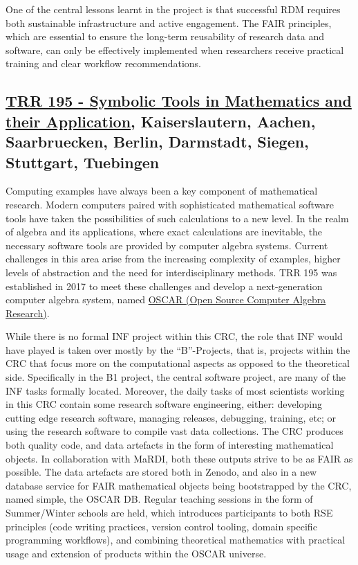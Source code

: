\documentclass{eceasst}
\begin{document}
One of the central lessons learnt in the project is that successful RDM requires both sustainable infrastructure and active engagement.
The FAIR principles, which are essential to ensure the long-term reusability of research data and software, can only be effectively implemented when researchers receive practical training and clear workflow recommendations.

\subsection{\href{https://www.computeralgebra.de/sfb/}{TRR 195 - Symbolic Tools in Mathematics and their Application}, Kaiserslautern, Aachen, Saarbruecken, Berlin, Darmstadt, Siegen, Stuttgart, Tuebingen}
Computing examples have always been a key component of mathematical research. Modern computers paired
with sophisticated mathematical software tools have taken the possibilities of such calculations to
a new level. In the realm of algebra and its applications, where exact calculations are inevitable,
the necessary software tools are provided by computer algebra systems. Current challenges in this
area arise from the increasing complexity of examples, higher levels of abstraction and the need for
interdisciplinary methods. TRR 195 was established in 2017 to meet these challenges and develop
a next-generation computer algebra system, named \href{https://www.oscar-system.org/}{OSCAR (Open
Source Computer Algebra Research)}.

While there is no formal INF project within this CRC, the role that INF would have played is taken
over mostly by the ``B''-Projects, that is, projects within the CRC that focus more on the
computational aspects as opposed to the theoretical side. Specifically in the B1 project, the
central software project, are many of the INF tasks formally located. Moreover, the daily tasks of
most scientists working in this CRC contain some research software engineering, either: developing
cutting edge research software, managing releases, debugging, training, etc; or using the research
software to compile vast data collections. The CRC produces both quality code, and data artefacts in
the form of interesting mathematical objects. In collaboration with MaRDI, both these outputs strive
to be as FAIR as possible. The data artefacts are stored both in Zenodo, and also in a new database
service for FAIR mathematical objects being bootstrapped by the CRC, named simple, the OSCAR DB.\@
Regular teaching sessions in the form of Summer/Winter schools are held, which introduces
participants to both RSE principles (code writing practices, version control tooling, domain
specific programming workflows), and combining theoretical mathematics with practical usage and
extension of products within the OSCAR universe.
\end{document}
